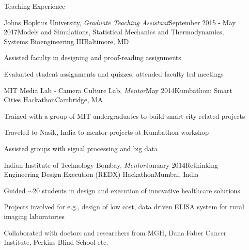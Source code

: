 \documentclass{resume}
\begin{document}
\begin{rSection}{Teaching Experience}

\begin{rSubsection}{Johns Hopkins University, \textit{Graduate Teaching Assistant}}{September 2015 - May 2017}{Models and Simulations, Statistical Mechanics and Thermodynamics, Systems Bioengineering III}{Baltimore, MD}
\item Assisted faculty in designing and proof-reading assignments
\item Evaluated student assignments and quizzes, attended faculty led meetings
    \end{rSubsection}

\begin{rSubsection}{MIT Media Lab - Camera Culture Lab, \textit{Mentor}}{May 2014}{Kumbathon: Smart Cities Hackathon}{Cambridge, MA}
\item  Trained with a group of MIT undergraduates to build smart city related projects 
\item Traveled to Nasik, India to mentor projects at Kumbathon workshop
\item Assisted groups with signal processing and big data
    \end{rSubsection}

\begin{rSubsection}{Indian Institute of Technology Bombay, \textit{Mentor}}{January 2014}{Rethinking Engineering Design Execution (REDX) Hackathon}{Mumbai, India}
\item Guided $\sim$20 students in design and execution of innovative healthcare solutions
\item Projects involved for e.g., design of low cost, data driven ELISA system for rural imaging laboratories
\item Collaborated with doctors and researchers from MGH, Dana Faber Cancer Institute, Perkins Blind School etc.
    \end{rSubsection}

  \end{rSection}

\vspace{1em}
\end{document}
